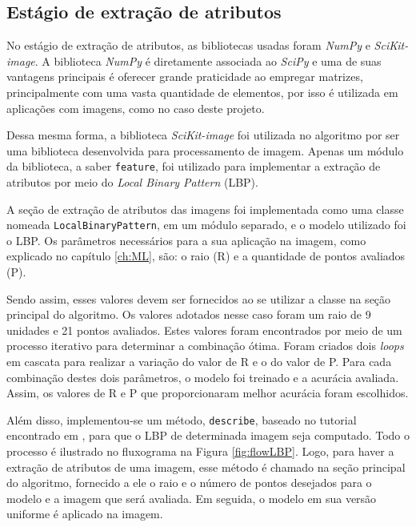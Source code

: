 

\subsection{Estágio de extração de atributos}

No estágio de extração de atributos, as bibliotecas usadas foram \textit{NumPy} e \textit{SciKit-image}. A biblioteca \textit{NumPy} é diretamente associada ao \textit{SciPy} e uma de suas vantagens principais é oferecer grande praticidade ao empregar matrizes, principalmente com uma vasta quantidade de elementos, por isso é utilizada em aplicações com imagens, como no caso deste projeto.

Dessa mesma forma, a biblioteca \textit{SciKit-image} foi utilizada no algoritmo por ser uma biblioteca desenvolvida para processamento de imagem. Apenas um módulo da biblioteca, a saber \texttt{feature}, foi utilizado para implementar a extração de atributos por meio do \textit{Local Binary Pattern} (LBP).

A seção de extração de atributos das imagens foi implementada como uma classe nomeada \texttt{LocalBinaryPattern}, em um módulo separado, e o modelo utilizado foi o LBP. Os parâmetros necessários para a sua aplicação na imagem, como explicado no capítulo \ref{ch:ML}, são: o raio (R) e a quantidade de pontos avaliados (P).

Sendo assim, esses valores devem ser fornecidos ao se utilizar a classe na seção principal do algoritmo. Os valores adotados nesse caso foram um raio de 9 unidades e 21 pontos avaliados. Estes valores foram encontrados por meio de um processo iterativo para determinar a combinação ótima. Foram criados dois \textit{loops} em cascata para realizar a variação do valor de R e o do valor de P. Para cada combinação destes dois parâmetros, o modelo foi treinado e a acurácia avaliada. Assim, os valores de R e P que proporcionaram melhor acurácia foram escolhidos.

Além disso, implementou-se um método, \texttt{describe}, baseado no tutorial encontrado em , para que o LBP de determinada imagem seja computado. Todo o processo é ilustrado no fluxograma na Figura \ref{fig:flowLBP}. Logo, para haver a extração de atributos de uma imagem, esse método é chamado na seção principal do algoritmo, fornecido a ele o raio e o número de pontos desejados para o modelo e a imagem que será avaliada. Em seguida, o modelo em sua versão uniforme é aplicado na imagem.

